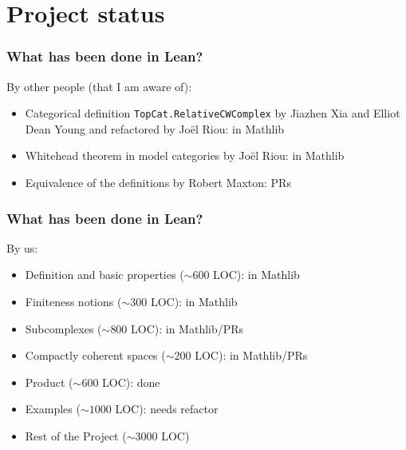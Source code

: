 \documentclass{beamer}
\begin{document}

\section{Project status}

\begin{frame}%
\frametitle{What has been done in Lean?}
By other people (that I am aware of): 
  \begin{itemize}
    \item[\textcolor{Green}{\textbullet}] Categorical definition \lstinline|TopCat.RelativeCWComplex| by Jiazhen Xia and Elliot Dean Young and refactored by Joël Riou: in Mathlib
    \item[\textcolor{Green}{\textbullet}] Whitehead theorem in model categories by Joël Riou: in Mathlib
    \item[\textcolor{Yellow}{\textbullet}] Equivalence of the definitions by Robert Maxton: PRs
  \end{itemize}
\end{frame}

\begin{frame}
\frametitle{What has been done in Lean?}
By us: 
  \begin{itemize}
    \item[\textcolor{Green}{\textbullet}] Definition and basic properties ($\sim 600$ LOC): in Mathlib
    \item[\textcolor{Green}{\textbullet}] Finiteness notions ($\sim 300$ LOC): in Mathlib
    \item[\textcolor{Yellow}{\textbullet}] Subcomplexes ($\sim 800$ LOC): in Mathlib/PRs
    \item[\textcolor{Yellow}{\textbullet}] Compactly coherent spaces ($\sim 200$ LOC): in Mathlib/PRs
    \item[\textcolor{YellowOrange}{\textbullet}] Product ($\sim 600$ LOC): done
    \item[\textcolor{Orange}{\textbullet}] Examples ($\sim 1000$ LOC): needs refactor
    \item[\textbullet] Rest of the Project ($\sim 3000$ LOC)
  \end{itemize}
\end{frame}
\end{document}
